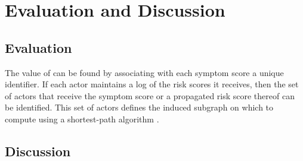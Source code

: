 \chapter{Evaluation and Discussion}

\section{Evaluation}

The value of  can be found by associating with each symptom score a unique identifier. If each actor maintains a log of the risk scores it receives, then the set of actors that receive the symptom score or a propagated risk score thereof can be identified. This set of actors defines the induced subgraph on which to compute  using a shortest-path algorithm \citep{Johnson1977}. 

\section{Discussion}